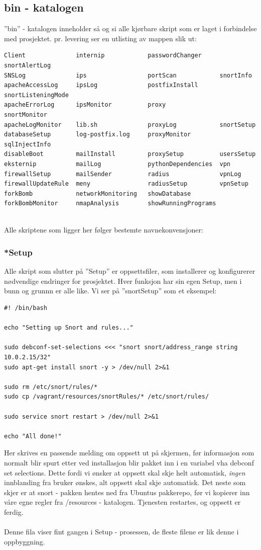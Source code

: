 \documentclass{article}
\begin{document}
\subsection{bin - katalogen}
''bin'' - katalogen inneholder så og si alle kjørbare skript som er laget i forbindelse med prosjektet. pr. levering ser en utlisting av mappen slik ut: 
\begin{lstlisting}
Client              internip            passwordChanger     snortAlertLog
SNSLog              ips                 portScan            snortInfo
apacheAccessLog     ipsLog              postfixInstall      snortListeningMode
apacheErrorLog      ipsMonitor          proxy               snortMonitor
apacheLogMonitor    lib.sh              proxyLog            snortSetup
databaseSetup       log-postfix.log     proxyMonitor        sqlInjectInfo
disableBoot         mailInstall         proxySetup          usersSetup
eksternip           mailLog             pythonDependencies  vpn
firewallSetup       mailSender          radius              vpnLog
firewallUpdateRule  meny                radiusSetup         vpnSetup
forkBomb            networkMonitoring   showDatabase
forkBombMonitor     nmapAnalysis        showRunningPrograms
\end{lstlisting}
\\
Alle skriptene som ligger her følger  bestemte navnekonvensjoner: 
\subsubsection{*Setup}
Alle skript som slutter på ''Setup'' er oppsettsfiler, som installerer og konfigurerer nødvendige endringer for prosjektet. Hver funksjon har sin egen Setup, men i bunn og grunnn er alle like. Vi ser på ''snortSetup'' som et eksempel:  
\begin{lstlisting}
#! /bin/bash

echo "Setting up Snort and rules..."

sudo debconf-set-selections <<< "snort snort/address_range string 10.0.2.15/32"
sudo apt-get install snort -y > /dev/null 2>&1

sudo rm /etc/snort/rules/*
sudo cp /vagrant/resources/snortRules/* /etc/snort/rules/

sudo service snort restart > /dev/null 2>&1

echo "All done!"
\end{lstlisting}
Her skrives en passende melding om oppsett ut på skjermen, før informasjon som normalt blir spurt etter ved installasjon blir pakket inn i en variabel vha
debconf set selections. Dette fordi vi ønsker at oppsett skal skje helt automatisk, \textit{ingen} innblanding fra bruker ønskes, alt oppsett skal skje automatisk. Det neste som skjer er at snort - pakken hentes ned fra Ubuntus pakkerepo, før vi kopierer inn våre egne regler fra /resources - katalogen. 
Tjenesten restartes, og oppsett er ferdig. \\ \\
Denne fila viser fint gangen i Setup - prosessen, de fleste filene er lik denne i oppbyggning.
\end{document}
